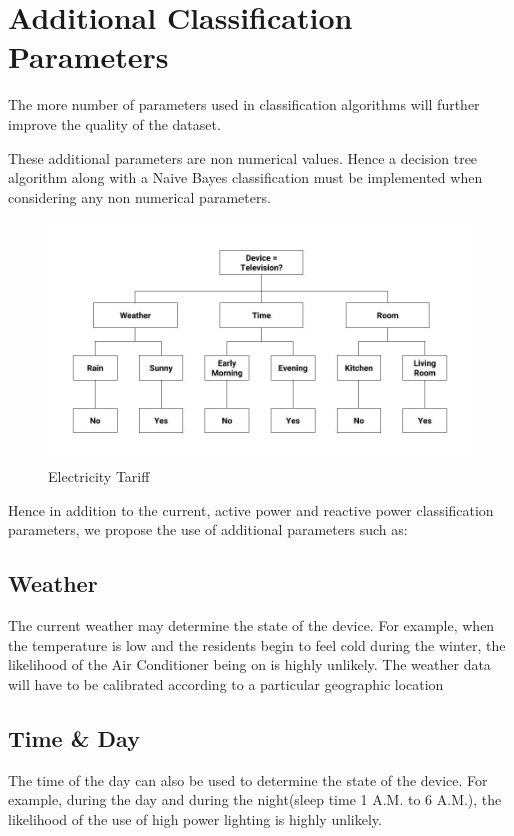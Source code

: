 \section{Additional Classification Parameters}
The more number of parameters used in classification algorithms will further improve the quality of the dataset.

These additional parameters are non numerical values. Hence a decision tree algorithm along with a Naive Bayes classification must be implemented when considering any non numerical parameters.

\begin{figure}[H]
	    \includegraphics[scale=0.45]{images/tree.jpg}
	    \centering
	    \caption{Electricity Tariff}
	    \label{cost}
	\end{figure}


Hence in addition to the current, active power and reactive power classification parameters, we propose the use of additional parameters such as:

\subsection{Weather}
The current weather may determine the state of the device. For example, when the temperature is low and the residents begin to feel cold during the winter, the likelihood of the Air Conditioner being on is highly unlikely.
The weather data will have to be calibrated according to a particular geographic location

\subsection{Time & Day}
The time of the day can also be used to determine the state of the device. For example, during the day and during the night(sleep time 1 A.M. to 6 A.M.), the likelihood of the use of high power lighting is highly unlikely.

